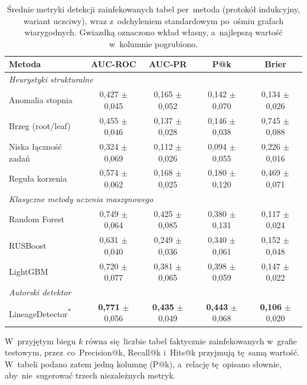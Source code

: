 \documentclass[polish,master,a4paper,oneside]{ppfcmthesis}
\renewcommand{\_}{\origtextunderscore\ifmmode\else\allowbreak\fi}
\begin{document}
\begin{table}[ht]
\centering
\caption[Średnie metryki detekcji zainfekowanych tabel]{Średnie metryki detekcji zainfekowanych tabel per~metoda (protokół
indukcyjny, wariant uczciwy), wraz z~odchyleniem standardowym po~ośmiu grafach
wiarygodnych. Gwiazdką oznaczono wkład własny, a~najlepszą wartość
w~kolumnie pogrubiono.}
\label{tab:wyniki-detekcja}
\small
\begin{tabular}{lcccc}
\toprule
\textbf{Metoda} & \textbf{AUC-ROC} & \textbf{AUC-PR} & \textbf{P@k} & \textbf{Brier} \\
\midrule
\multicolumn{5}{l}{\emph{Heurystyki strukturalne}} \\
Anomalia stopnia      & 0{,}427 $\pm$ 0{,}045 & 0{,}165 $\pm$ 0{,}052 & 0{,}142 $\pm$ 0{,}070 & 0{,}134 $\pm$ 0{,}026 \\
Brzeg (root/leaf)     & 0{,}455 $\pm$ 0{,}046 & 0{,}137 $\pm$ 0{,}028 & 0{,}146 $\pm$ 0{,}038 & 0{,}745 $\pm$ 0{,}088 \\
Niska łączność zadań  & 0{,}324 $\pm$ 0{,}069 & 0{,}112 $\pm$ 0{,}026 & 0{,}094 $\pm$ 0{,}055 & 0{,}226 $\pm$ 0{,}016 \\
Reguła korzenia       & 0{,}574 $\pm$ 0{,}062 & 0{,}168 $\pm$ 0{,}025 & 0{,}180 $\pm$ 0{,}120 & 0{,}469 $\pm$ 0{,}071 \\
\midrule
\multicolumn{5}{l}{\emph{Klasyczne metody uczenia maszynowego}} \\
Random Forest         & 0{,}749 $\pm$ 0{,}064 & 0{,}425 $\pm$ 0{,}085 & 0{,}380 $\pm$ 0{,}131 & 0{,}117 $\pm$ 0{,}024 \\
RUSBoost              & 0{,}631 $\pm$ 0{,}040 & 0{,}249 $\pm$ 0{,}036 & 0{,}340 $\pm$ 0{,}061 & 0{,}152 $\pm$ 0{,}048 \\
LightGBM              & 0{,}720 $\pm$ 0{,}077 & 0{,}381 $\pm$ 0{,}065 & 0{,}398 $\pm$ 0{,}059 & 0{,}147 $\pm$ 0{,}022 \\
\midrule
\multicolumn{5}{l}{\emph{Autorski detektor}} \\
LineageDetector\textsuperscript{*} & \textbf{0{,}771} $\pm$ 0{,}056 & \textbf{0{,}435} $\pm$ 0{,}049 & \textbf{0{,}443} $\pm$ 0{,}068 & \textbf{0{,}106} $\pm$ 0{,}020 \\
\bottomrule
\end{tabular}
\end{table}

W~przyjętym biegu $k$ równa się~liczbie tabel faktycznie zainfekowanych
w~grafie testowym, przez~co~Precision@k, Recall@k i~Hits@k przyjmują tę~samą
wartość. W~tabeli podano zatem jedną kolumnę (P@k), a~relację tę~opisano
słownie, aby~nie~sugerować trzech niezależnych metryk.
\end{document}

